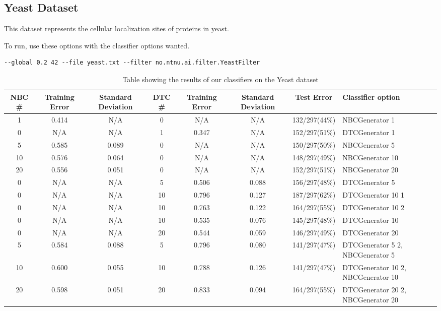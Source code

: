 \subsection{Yeast Dataset}\label{yeast}
This dataset represents the cellular localization sites of proteins in yeast.

To run, use these options with the classifier options wanted.

\begin{lstlisting}[label=lst:yeast, caption=Yeast dataset general 
options]
--global 0.2 42 --file yeast.txt --filter no.ntnu.ai.filter.YeastFilter
\end{lstlisting}

\begin{landscape}
\begin{table}
\begin{tabular}{|c|c|c||c|c|c||c||p{5cm}|}
\hline
NBC \# & Training Error & Standard Deviation & DTC \# & Training Error
& Standard Deviation & Test Error & Classifier option \\ \hline
1 & 0.414 & N/A & 0 & N/A & N/A & 132/297(44\%) & NBCGenerator 1 \\ \hline
0 & N/A & N/A & 1 & 0.347 & N/A & 152/297(51\%) & DTCGenerator 1 \\ \hline
5 & 0.585 & 0.089 & 0 & N/A & N/A & 150/297(50\%) & NBCGenerator 5 \\ \hline
10 & 0.576 & 0.064 & 0 & N/A & N/A & 148/297(49\%) & NBCGenerator 10 \\ \hline
20 & 0.556 & 0.051 & 0 & N/A & N/A & 152/297(51\%) & NBCGenerator 20 \\ \hline
0 & N/A & N/A & 5 & 0.506 & 0.088 & 156/297(48\%) & DTCGenerator 5 \\ \hline
0 & N/A & N/A & 10 & 0.796 & 0.127 & 187/297(62\%) & DTCGenerator 10 1 \\ 
\hline
0 & N/A & N/A & 10 & 0.763 & 0.122 & 164/297(55\%) & DTCGenerator 10 2 \\ 
\hline
0 & N/A & N/A & 10 & 0.535 & 0.076 & 145/297(48\%) & DTCGenerator 10 \\ \hline
0 & N/A & N/A & 20 & 0.544 & 0.059 & 146/297(49\%) & DTCGenerator 20 \\ \hline
5 & 0.584 & 0.088 & 5 & 0.796 & 0.080 & 141/297(47\%) & DTCGenerator 5 2, 
\newline NBCGenerator 5 \\ \hline
10 & 0.600 & 0.055 & 10 & 0.788 & 0.126 & 141/297(47\%) & DTCGenerator 10 2, 
\newline NBCGenerator 10 \\ \hline
20 & 0.598 & 0.051 & 20 & 0.833 & 0.094 & 164/297(55\%) & DTCGenerator 20 2, 
\newline NBCGenerator 20 \\ \hline
\hline
\end{tabular}
\label{tab:yeast}
\caption[Yeast dataset boosting]{Table showing the results of our classifiers 
on the Yeast dataset}
\end{table}
\end{landscape}

